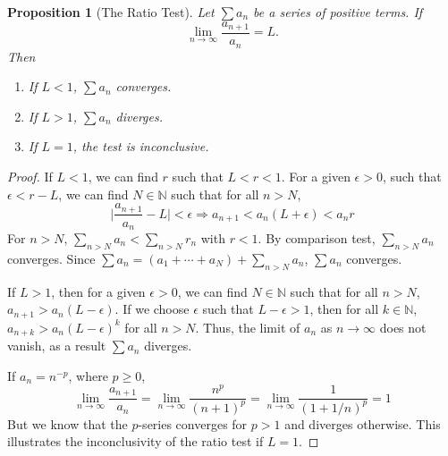 \documentclass{article}
\theoremstyle{plain}
\numberwithin{thm}{section}
\theoremstyle{plain}
\newtheorem{prop}{Proposition}
\numberwithin{prop}{section}
\theoremstyle{definition}
\numberwithin{defn}{section}
\theoremstyle{remark}
\numberwithin{equation}{section}
\begin{document}
\begin{prop}[The Ratio Test]\label{s4p4}
Let $\sum a_n$ be a series of positive terms. If
\[
\lim_{n \rightarrow \infty}\frac{a_{n+1}}{a_n} = L.
\]
Then 
\begin{enumerate}
\item If $L < 1$, $\sum a_n$ converges.
\item If $L > 1$, $\sum a_n$ diverges.
\item If $L = 1$, the test is inconclusive.
\end{enumerate}
\end{prop}
\begin{proof}
If $L < 1$, we can find $r$ such that $L < r < 1$. For a given $\epsilon > 0$,
such that $\epsilon < r - L$, we can find $N \in \mathbb{N}$ such that for all 
$n > N$,
\[
\Big|\frac{a_{n+1}}{a_n} - L\Big| < \epsilon \Rightarrow a_{n+1} < 
a_n(L + \epsilon) < a_n r
\]
For $n > N$, $\sum_{n > N} a_n < \sum_{n > N} r_n$ with $r < 1$. By comparison 
test, $\sum_{n > N} a_n$ converges. Since $\sum a_n = (a_1 + \cdots + a_N) + 
\sum_{n > N} a_n$, $\sum a_n$ converges.

If $L > 1$, then for a given $\epsilon > 0$, we can find $N \in \mathbb{N}$ such
that for all $n > N$, $a_{n + 1} > a_n(L - \epsilon)$. If we choose $\epsilon$
such that $L - \epsilon > 1$, then for all $k \in \mathbb{N}$, $a_{n+k} > a_n
(L - \epsilon)^k$ for all $n > N$. Thus, the limit of $a_n$ as $n \rightarrow
\infty$ does not vanish, as a result $\sum a_n$ diverges.

If $a_n = n^{-p}$, where $p \ge 0$, 
\[
\lim_{n \rightarrow \infty}\frac{a_{n+1}}{a_n} = \lim_{n \rightarrow \infty}
\frac{n^p}{(n + 1)^p} = \lim_{n \rightarrow \infty} \frac{1}{(1 + 1/n)^p} = 1
\]
But we know that the $p$-series converges for $p > 1$ and diverges otherwise.
This illustrates the inconclusivity of the ratio test if $L = 1$.
\end{proof}
\end{document}
